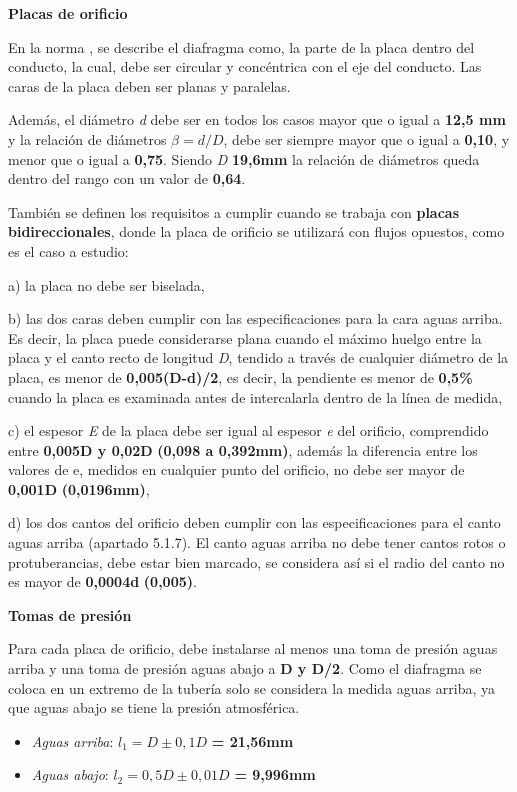\textbf{Placas de orificio}

En la norma \cite{une03}, se describe el diafragma como, la parte
de la placa dentro del conducto, la cual, debe ser circular y
concéntrica con el eje del conducto. Las caras de la placa deben ser
planas y paralelas.

Además, el diámetro \emph{d} debe ser en todos los casos mayor que o
igual a \textbf{12,5 mm} y la relación de diámetros \(\beta =d/D\), debe
ser siempre mayor que o igual a \textbf{0,10}, y menor que o igual a
\textbf{0,75}. Siendo \emph{D} \textbf{19,6mm} la relación de diámetros
queda dentro del rango con un valor de \textbf{0,64}.

También se definen los requisitos a cumplir cuando se
trabaja con \textbf{placas bidireccionales}, donde la placa de orificio
se utilizará con flujos opuestos, como es el caso a estudio:

 a) la placa no debe ser biselada,

 b) las dos caras deben cumplir con las especificaciones para la cara
aguas arriba. Es decir, la placa puede
considerarse plana cuando el máximo huelgo entre la placa y el canto
recto de longitud \emph{D}, tendido a través de cualquier diámetro de la
placa, es menor de \textbf{0,005(D-d)/2}, es decir, la pendiente es
menor de \textbf{0,5\%} cuando la placa es examinada antes de
intercalarla dentro de la línea de medida,

 c) el espesor \emph{E} de la placa debe ser igual al espesor \emph{e}
del orificio, comprendido entre \textbf{0,005D y 0,02D}
\textbf{(0,098 a 0,392mm)}, además la diferencia entre los valores de e,
medidos en cualquier punto del orificio, no debe ser mayor de
\textbf{0,001D} \textbf{(0,0196mm)},

 d) los dos cantos del orificio deben cumplir con las especificaciones
para el canto aguas arriba (apartado 5.1.7). El canto aguas arriba no
debe tener cantos rotos o protuberancias, debe estar bien marcado, se
considera así si el radio del canto no es mayor de \textbf{0,0004d}
\textbf{(0,005)}.

\textbf{Tomas de presión}

Para cada placa de orificio, debe instalarse al menos una toma de
presión aguas arriba y una toma de presión aguas abajo a \textbf{D y
D/2}. Como el diafragma se coloca en un extremo de la
tubería solo se considera la medida aguas arriba, ya que aguas abajo se
tiene la presión atmosférica.

\begin{itemize}
\item
  \emph{Aguas arriba}: $l_1 = D \pm 0,1D$ \textbf{= \textbf{21,56mm}}
\item
  \emph{Aguas abajo}: $l_2 = 0,5D \pm 0,01D$ \textbf{= 9,996mm}
\end{itemize}

